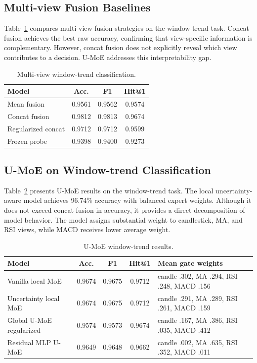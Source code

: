 ﻿\documentclass[conference]{IEEEtran}
\newcommand{\method}{U-MoE}
\begin{document}
\subsection{Multi-view Fusion Baselines}
Table~\ref{tab:fusion} compares multi-view fusion strategies on the window-trend task. Concat fusion achieves the best raw accuracy, confirming that view-specific information is complementary. However, concat fusion does not explicitly reveal which view contributes to a decision. \method{} addresses this interpretability gap.

\begin{table}[t]
\centering
\caption{Multi-view window-trend classification.}
\label{tab:fusion}
\begin{tabular}{lccc}
\toprule
Model & Acc. & F1 & Hit@1 \\
\midrule
Mean fusion & 0.9561 & 0.9562 & 0.9574 \\
Concat fusion & 0.9812 & 0.9813 & 0.9674 \\
Regularized concat & 0.9712 & 0.9712 & 0.9599 \\
Frozen probe & 0.9398 & 0.9400 & 0.9273 \\
\bottomrule
\end{tabular}
\end{table}

\subsection{\method{} on Window-trend Classification}
Table~\ref{tab:umoe-window} presents \method{} results on the window-trend task. The local uncertainty-aware model achieves 96.74\% accuracy with balanced expert weights. Although it does not exceed concat fusion in accuracy, it provides a direct decomposition of model behavior. The model assigns substantial weight to candlestick, MA, and RSI views, while MACD receives lower average weight.

\begin{table}[t]
\centering
\caption{\method{} window-trend results.}
\label{tab:umoe-window}
\begin{tabular}{lcccl}
\toprule
Model & Acc. & F1 & Hit@1 & Mean gate weights \\
\midrule
Vanilla local MoE & 0.9674 & 0.9675 & 0.9712 & candle .302, MA .294, RSI .248, MACD .156 \\
Uncertainty local MoE & 0.9674 & 0.9675 & 0.9712 & candle .291, MA .289, RSI .261, MACD .159 \\
Global U-MoE regularized & 0.9574 & 0.9573 & 0.9674 & candle .167, MA .386, RSI .035, MACD .412 \\
Residual MLP U-MoE & 0.9649 & 0.9648 & 0.9662 & candle .002, MA .635, RSI .352, MACD .011 \\
\bottomrule
\end{tabular}
\end{table}
\end{document}
